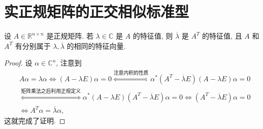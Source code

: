 \documentclass[../../main.tex]{subfiles}%
\begin{document}
\section{实正规矩阵的正交相似标准型}

\begin{lemma}\label{lemma:正规矩阵与其转置有相同特征向量}
设 $A \in \mathbb{R}^{n \times n}$ 是正规矩阵. 若 $\lambda \in \mathbb{C}$ 是 $A$ 的特征值, 则 $\overline{\lambda}$ 是 $A^T$ 的特征值, 且 $A$ 和 $A^T$ 有分别属于 $\lambda,\overline{\lambda}$ 的相同的特征向量.
\end{lemma}
\begin{proof}

设 $\alpha \in \mathbb{C}^n$, 注意到
\begin{align*}
&A\alpha = \lambda\alpha \iff (A - \lambda E)\alpha = 0 \stackrel{\text{注意内积的性质}}{\iff} \alpha^*(A^T - \overline{\lambda}E)(A - \lambda E)\alpha = 0 \\
&\stackrel{\text{矩阵乘法之后利用正规定义}}{\iff} \alpha^*(A - \lambda E)(A^T - \overline{\lambda}E)\alpha = 0 \iff (A^T - \overline{\lambda}E)\alpha = 0 
\\
&\iff A^T\alpha = \overline{\lambda}\alpha,
\end{align*}
这就完成了证明.
\end{proof}
\end{document}
